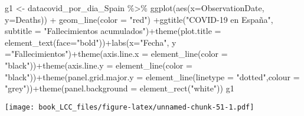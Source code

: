 \documentclass[
]{book}
\newenvironment{Shaded}{\begin{snugshade}}{\end{snugshade}}
\newcommand{\AttributeTok}[1]{\textcolor[rgb]{0.77,0.63,0.00}{#1}}
\newcommand{\FunctionTok}[1]{\textcolor[rgb]{0.00,0.00,0.00}{#1}}
\newcommand{\NormalTok}[1]{#1}
\newcommand{\OtherTok}[1]{\textcolor[rgb]{0.56,0.35,0.01}{#1}}
\newcommand{\SpecialCharTok}[1]{\textcolor[rgb]{0.00,0.00,0.00}{#1}}
\newcommand{\StringTok}[1]{\textcolor[rgb]{0.31,0.60,0.02}{#1}}
\begin{document}
\begin{Shaded}
\begin{Highlighting}[]
\NormalTok{g1 }\OtherTok{\textless{}{-}}\NormalTok{ datacovid\_por\_dia\_Spain }\SpecialCharTok{\%\textgreater{}\%}
    \FunctionTok{ggplot}\NormalTok{(}\FunctionTok{aes}\NormalTok{(}\AttributeTok{x=}\NormalTok{ObservationDate, }\AttributeTok{y=}\NormalTok{Deaths)) }\SpecialCharTok{+}  \FunctionTok{geom\_line}\NormalTok{(}\AttributeTok{color =} \StringTok{"red"}\NormalTok{) }\SpecialCharTok{+}\FunctionTok{ggtitle}\NormalTok{(}\StringTok{"COVID{-}19 en España"}\NormalTok{, }\AttributeTok{subtitle =} \StringTok{"Fallecimientos acumulados"}\NormalTok{)}\SpecialCharTok{+}\FunctionTok{theme}\NormalTok{(}\AttributeTok{plot.title =} \FunctionTok{element\_text}\NormalTok{(}\AttributeTok{face=}\StringTok{"bold"}\NormalTok{))}\SpecialCharTok{+}\FunctionTok{labs}\NormalTok{(}\AttributeTok{x=}\StringTok{"Fecha"}\NormalTok{, }\AttributeTok{y =}\StringTok{"Fallecimientos"}\NormalTok{)}\SpecialCharTok{+}\FunctionTok{theme}\NormalTok{(}\AttributeTok{axis.line.x =} \FunctionTok{element\_line}\NormalTok{(}\AttributeTok{color =} \StringTok{"black"}\NormalTok{))}\SpecialCharTok{+}\FunctionTok{theme}\NormalTok{(}\AttributeTok{axis.line.y =} \FunctionTok{element\_line}\NormalTok{(}\AttributeTok{color =} \StringTok{"black"}\NormalTok{))}\SpecialCharTok{+}\FunctionTok{theme}\NormalTok{(}\AttributeTok{panel.grid.major.y =} \FunctionTok{element\_line}\NormalTok{(}\AttributeTok{linetype =} \StringTok{"dotted"}\NormalTok{,}\AttributeTok{colour =} \StringTok{"grey"}\NormalTok{))}\SpecialCharTok{+}\FunctionTok{theme}\NormalTok{(}\AttributeTok{panel.background =} \FunctionTok{element\_rect}\NormalTok{(}\StringTok{"white"}\NormalTok{))}
\NormalTok{g1}
\end{Highlighting}
\end{Shaded}

\texttt{[image: book\_LCC\_files/figure-latex/unnamed-chunk-51-1.pdf]}
\end{document}
